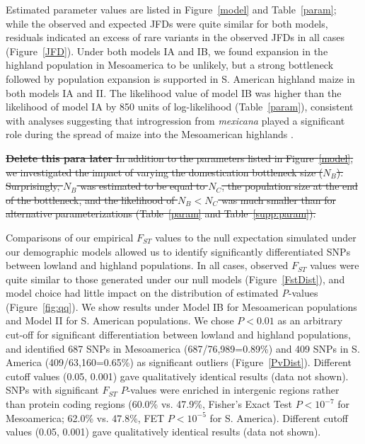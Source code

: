 Estimated parameter values are listed in Figure~\ref{model} and Table~\ref{param}; while the observed and expected JFDs were quite similar for both models,  residuals indicated an excess of rare variants in the observed JFDs in all cases (Figure~\ref{JFD}). 
Under both models IA and IB,  we found expansion in the highland population in Mesoamerica to be unlikely, but a strong bottleneck followed by population expansion is supported in S. American highland maize in both models IA and II.  
The likelihood value of model IB was higher than the likelihood of model IA by 850 units of log-likelihood (Table~\ref{param}), consistent with analyses suggesting that introgression from \textit{mexicana} played a significant role during the spread of maize into the Mesoamerican highlands \cite[]{Profford_2013}. 

\st{ {\bf Delete this para later} In addition to the parameters listed in Figure~\ref{model}, we investigated the impact of varying the domestication bottleneck size ($N_B$).  
Surprisingly, $N_B$ was estimated to be equal to $N_C$, the population size at the end of the bottleneck, and the likelihood of $N_B<N_C$ was much smaller than for alternative parameterizations (Table~\ref{param} and Table~\ref{supp:param}). }

Comparisons of our empirical $F_{ST}$ values to the null expectation simulated under our demographic models allowed us to identify significantly differentiated SNPs between lowland and highland populations. In all cases, observed $F_{ST}$ values were quite similar to those generated under our null models (Figure~\ref{FstDist}), and model choice %
had little impact on the distribution of estimated \emph{P}-values (Figure~\ref{fig:qq}). 
We show results under Model IB for Mesoamerican populations and Model II for S. American populations.
We chose $P<0.01$ as an arbitrary cut-off for significant differentiation between lowland and highland populations, and identified 687 SNPs in Mesoamerica (687/76,989=0.89\%) and 409 SNPs in S. America (409/63,160=0.65\%) as significant outliers (Figure~\ref{PvDist}). Different cutoff values (0.05, 0.001) gave qualitatively identical results (data not shown). SNPs with significant $F_{ST}$ $P$-values were enriched in intergenic regions rather than protein coding regions (60.0\% vs. 47.9\%, Fisher's Exact Test $P < 10^{-7}$ for Mesoamerica; 62.0\% vs. 47.8\%, FET $P<10^{-5}$ for S. America).
Different cutoff values (0.05, 0.001) gave qualitatively identical results (data not shown).

